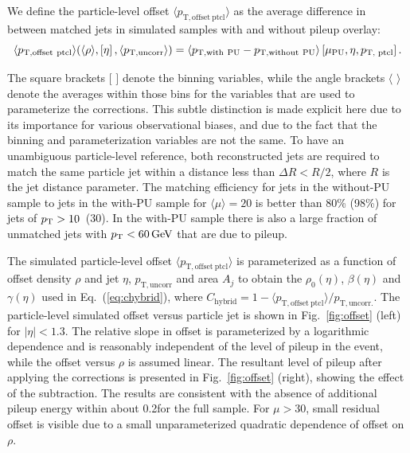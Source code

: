 \documentclass[11pt,twoside,a4paper,cmspaper,final,collab]{cms-tdr}
\begin{document}
We define the particle-level offset $\langle p_\mathrm{T, offset~ptcl}\rangle$ as the average difference in \pt between matched jets in simulated samples with and without pileup overlay:
\begin{equation}
\label{eq:offsetptcl}
\langle p_\mathrm{T, offset~ptcl}\rangle
(\langle\rho\rangle, \left[ \eta\right], \langle p_\mathrm{T, uncorr}\rangle)
= \langle p_{\mathrm{T},\rm with~PU} - p_{\mathrm{T},\rm without~PU}\rangle
\left[\mu_\mathrm{PU}, \eta, p_\text{T, ptcl} \right].
\end{equation}

The square brackets $[$ $]$ denote the binning variables, while the angle brackets $\langle$ $\rangle$ denote the averages within those bins for the variables that are used to parameterize the corrections. This subtle distinction is made explicit here due to its importance for various observational biases, and due to the fact that the binning and parameterization variables are not the same.
To have an unambiguous particle-level reference, both reconstructed jets are required
to match the same particle jet within a distance less than $\Delta R < R/2$, where $R$ is the jet distance parameter.
The matching efficiency for jets in the without-PU sample to jets in the with-PU sample for $\langle\mu\rangle=20$ is better than 80\% (98\%) for jets of $p_{\mathrm{T}}>10$~(30)\GeV.
In the with-PU sample there is also a large fraction of unmatched jets with $p_{\mathrm{T}}<60\,\text{Ge\hspace{-.08em}V}$ that are due to pileup.

The simulated particle-level offset $\langle p_\mathrm{T, offset~ptcl}\rangle$ is parameterized as a function of offset density $\rho$ and jet $\eta$, $p_\mathrm{T, uncorr}$ and area $A_j$
to obtain the $\rho_0(\eta)$, $\beta(\eta)$ and $\gamma(\eta)$ used in Eq.~(\ref{eq:chybrid}), where $C_\text{hybrid} = 1 - \langle p_\mathrm{T, offset~ptcl}\rangle/p_\mathrm{ T, uncorr.}$.
The particle-level simulated offset versus particle jet \pt is shown in Fig.~\ref{fig:offset} (left) for $\vert\eta\vert<1.3$.
The relative slope in offset is parameterized by a logarithmic \pt dependence and is reasonably independent of the level of pileup in the event, while the offset versus $\rho$ is assumed linear.
The resultant level of pileup after applying the corrections is presented in Fig.~\ref{fig:offset} (right), showing the effect of the subtraction. The results are consistent with the absence of additional pileup energy within about 0.2\GeV for the full sample.
For $\mu>30$, small residual offset is visible due to a small unparameterized quadratic dependence of offset on $\rho$.
\end{document}

